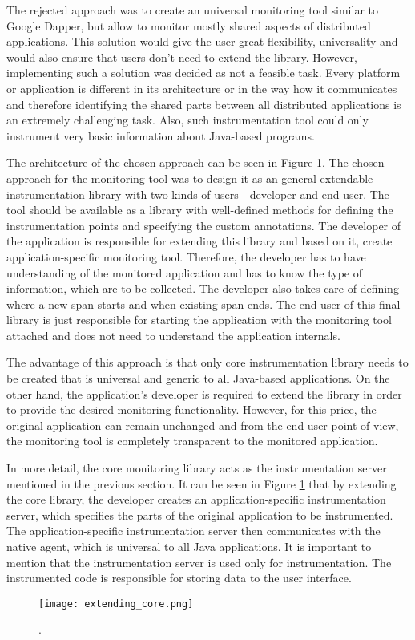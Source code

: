 The rejected approach was to create an universal monitoring tool similar to Google Dapper, but allow to monitor mostly shared aspects of distributed applications. This solution would give the user great flexibility, universality and would also ensure that users don't need to extend the library. However, implementing such a solution was decided as not a feasible task. Every platform or application is different in its architecture or in the way how it communicates and therefore identifying the shared parts between all distributed applications is an extremely challenging task. Also, such instrumentation tool could only instrument very basic information about Java-based programs.

The architecture of the chosen approach can be seen in Figure \ref{fig:extending_core}. The chosen approach for the monitoring tool was to design it as an general extendable instrumentation library with two kinds of users - developer and end user. The tool should be available as a library with well-defined methods for defining the instrumentation points and specifying the custom annotations. The developer of the application is responsible for extending this library and based on it, create application-specific monitoring tool. Therefore, the developer has to have understanding of the monitored application and has to know the type of information, which are to be collected. The developer also takes care of defining where a new span starts and when existing span ends. The end-user of this final library is just responsible for starting the application with the monitoring tool attached and does not need to understand the application internals.

The advantage of this approach is that only core instrumentation library needs to be created that is universal and generic to all Java-based applications. On the other hand, the application's developer is required to extend the library in order to provide the desired monitoring functionality. However, for this price, the original application can remain unchanged and from the end-user point of view, the monitoring tool is completely transparent to the monitored application.

In more detail, the core monitoring library acts as the instrumentation server mentioned in the previous section. It can be seen in Figure \ref{fig:extending_core} that by extending the core library, the developer creates an application-specific instrumentation server, which specifies the parts of the original application to be instrumented. The application-specific instrumentation server then communicates with the native agent, which is universal to all Java applications. It is important to mention that the instrumentation server is used only for instrumentation. The instrumented code is responsible for storing data to the user interface.
\begin{figure}
	\centering
	\texttt{[image: extending\_core.png]}
	\caption{.}
	\label{fig:extending_core}
\end{figure}



